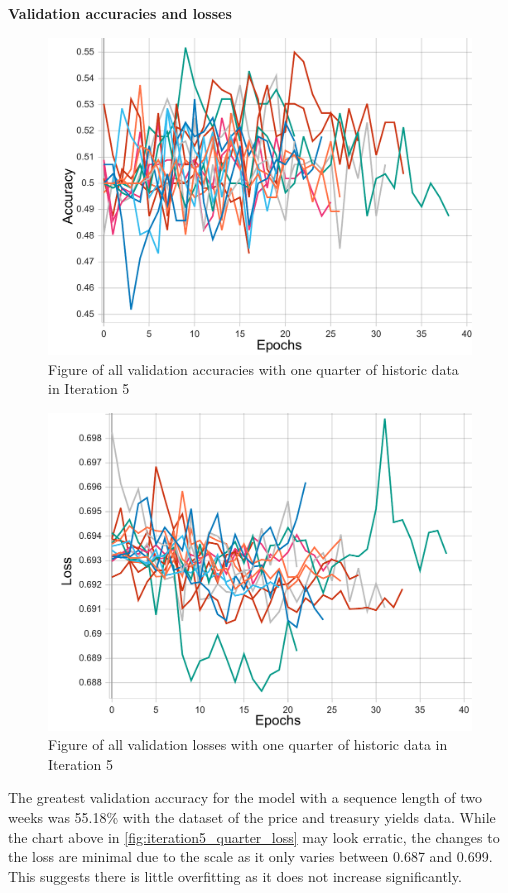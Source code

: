 \pagebreak
\textbf{Validation accuracies and losses}
\begin{figure}[ht]
    \centering
    \includegraphics[width=0.575\columnwidth]{figures/results/final/quarter_acc.pdf}
    \caption[Validation accuracies for Iteration 5 with one quarter of historic data]{Figure of all validation accuracies with one quarter of historic data in Iteration 5}
    \label{fig:iteration5_quarter_accuracy}
\end{figure}
\FloatBarrier

\begin{figure}[ht]
    \centering
    \includegraphics[width=0.575\columnwidth]{figures/results/final/quarter_loss.pdf}
    \caption[Validation losses for Iteration 5 with one quarter of historic data]{Figure of all validation losses with one quarter of historic data in Iteration 5}
    \label{fig:iteration5_quarter_loss}
\end{figure}
\FloatBarrier

The greatest validation accuracy for the model with a sequence length of two weeks was 55.18\% with the dataset of the price and treasury yields data.
While the chart above in \autoref{fig:iteration5_quarter_loss} may look erratic, the changes to the loss are minimal due to the scale as it only varies
between 0.687 and 0.699. This suggests there is little overfitting as it does not increase significantly.

